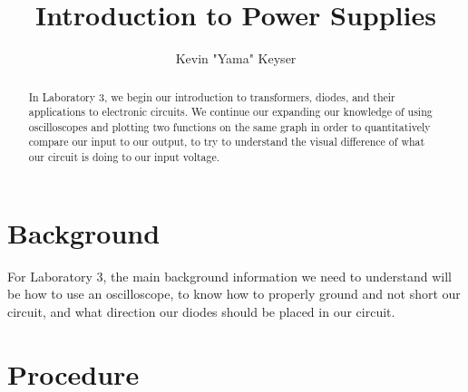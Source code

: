 \documentclass[%
 aip,
 jmp,
 amsmath,
 amssymb,
 reprint,%
 numerical,
 longbibliography,
]{revtex4-1}
\begin{document}

\title[Laboratory 3]{Introduction to Power Supplies} %

\author{Kevin "Yama" Keyser}
%


\begin{abstract}
In Laboratory 3, we begin our introduction to transformers, diodes, and their applications
to electronic circuits. We continue our expanding our knowledge of using oscilloscopes and
plotting two functions on the same graph in order to quantitatively compare our input
to our output, to try to understand the visual difference of what our circuit is doing
to our input voltage.
\end{abstract}

\maketitle

%

\section{Background}

For Laboratory 3, the main background information we need to understand will be how to
use an oscilloscope, to know how to properly ground and not short our circuit, and
what direction our diodes should be placed in our circuit.

\section{Procedure}
\end{document}
